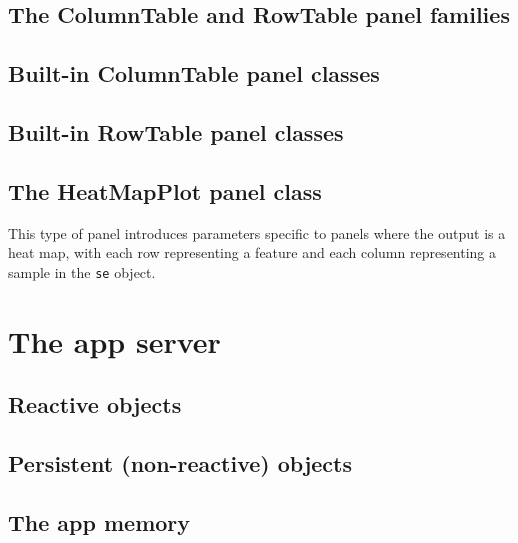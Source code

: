 \documentclass[]{book}
\begin{document}
\hypertarget{the-columntable-and-rowtable-panel-families}{%
\section{The ColumnTable and RowTable panel families}\label{the-columntable-and-rowtable-panel-families}}

\hypertarget{built-in-columntable-panel-classes}{%
\section{Built-in ColumnTable panel classes}\label{built-in-columntable-panel-classes}}

\hypertarget{built-in-rowtable-panel-classes}{%
\section{Built-in RowTable panel classes}\label{built-in-rowtable-panel-classes}}

\hypertarget{heatmapplot-class}{%
\section{The HeatMapPlot panel class}\label{heatmapplot-class}}

This type of panel introduces parameters specific to panels where the output is a heat map, with each row representing a feature and each column representing a sample in the \texttt{se} object.

\hypertarget{server}{%
\chapter{The app server}\label{server}}

\hypertarget{robjects}{%
\section{Reactive objects}\label{robjects}}

\hypertarget{persistent-non-reactive-objects}{%
\section{Persistent (non-reactive) objects}\label{persistent-non-reactive-objects}}

\hypertarget{memory}{%
\section{The app memory}\label{memory}}
\end{document}
